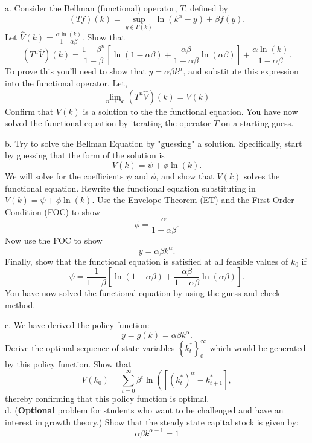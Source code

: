 \documentclass[11pt]{extarticle}
\theoremstyle{plain}
\theoremstyle{definition}
\begin{document}
\vspace{5mm}
\noindent
a. Consider the Bellman (functional) operator, $T$, defined by
$$
(T f)(k)=\sup _{y \in \Gamma(k)} \ln \left(k^\alpha-y\right)+\beta f(y) .
$$
Let $\hat{V}(k)=\frac{\alpha \ln (k)}{1-\alpha \beta}$. Show that
$$
\left(T^n \hat{V}\right)(k)=\frac{1-\beta^n}{1-\beta}\left[\ln (1-\alpha \beta)+\frac{\alpha \beta}{1-\alpha \beta} \ln (\alpha \beta)\right]+\frac{\alpha \ln (k)}{1-\alpha \beta} .
$$
To prove this you'll need to show that $y=\alpha \beta k^\alpha$, and substitute this expression into the functional operator. Let,
$$
\lim _{n \rightarrow \infty}\left(T^n \hat{V}\right)(k)=V(k)
$$
Confirm that $V(k)$ is a solution to the the functional equation. You have now solved the functional equation by iterating the operator $T$ on a starting guess.


\vspace{5mm}
\noindent
b. Try to solve the Bellman Equation by "guessing" a solution. Specifically, start by guessing that the form of the solution is
$$
V(k)=\psi+\phi \ln (k) .
$$
We will solve for the coefficients $\psi$ and $\phi$, and show that $V(k)$ solves the functional equation. Rewrite the functional equation substituting in $V(k)=\psi+\phi \ln (k)$. Use the Envelope Theorem (ET) and the First Order Condition (FOC) to show
$$
\phi=\frac{\alpha}{1-\alpha \beta} .
$$
Now use the FOC to show
$$
y=\alpha \beta k^\alpha .
$$
Finally, show that the functional equation is satisfied at all feasible values of $k_0$ if
$$
\psi=\frac{1}{1-\beta}\left[\ln (1-\alpha \beta)+\frac{\alpha \beta}{1-\alpha \beta} \ln (\alpha \beta)\right] .
$$
You have now solved the functional equation by using the guess and check method.


\vspace{5mm}
\noindent
c. We have derived the policy function:
$$
y=g(k)=\alpha \beta k^\alpha .
$$
Derive the optimal sequence of state variables $\left\{k_t^*\right\}_0^{\infty}$ which would be generated by this policy function. Show that
$$
V\left(k_0\right)=\sum_{t=0}^{\infty} \beta^t \ln \left(\left[\left(k_t^*\right)^\alpha-k_{t+1}^*\right],\right.
$$
thereby confirming that this policy function is optimal. \\


\vspace{5mm}
\noindent
d. (\textbf{Optional} problem for students who want to be challenged and have an interest in growth theory.) Show that the steady state capital stock is given by:
$$
\alpha \beta k^{\alpha-1}=1
$$
\end{document}
